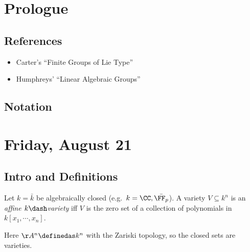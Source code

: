\newpage

\tableofcontents
\newpage

\hypertarget{prologue}{%
\section*{Prologue}\label{prologue}}

\hypertarget{references}{%
\subsection{References}\label{references}}

\begin{itemize}
\item
  Carter's ``Finite Groups of Lie Type''\autocite{carter_1985}
\item
  Humphreys' ``Linear Algebraic Groups''\autocite{humphreys_2004}
\end{itemize}

\hypertarget{notation}{%
\subsection{Notation}\label{notation}}


\newpage

\hypertarget{friday-august-21}{%
\section{Friday, August 21}\label{friday-august-21}}

\hypertarget{intro-and-definitions}{%
\subsection{Intro and Definitions}\label{intro-and-definitions}}

\begin{definition}

Let \(k=\bar{k}\) be algebraically closed
(e.g.~\(k = \CC, \bar{\FF_p}\)). A variety \(V\subseteq k^n\) is an
\emph{affine \(k\dash\)variety} iff \(V\) is the zero set of a
collection of polynomials in \(k[x_1, \cdots, x_n]\).

\end{definition}

Here \(\AA^n\definedas k^n\) with the Zariski topology, so the closed
sets are varieties.

